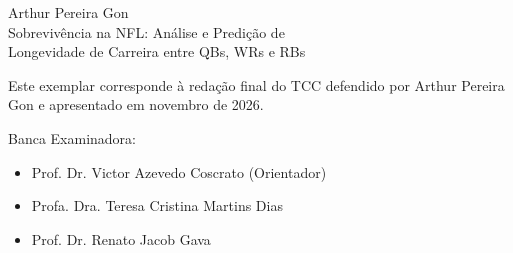 
\clearpage{\thispagestyle{empty}\origcleardoublepage}
\thispagestyle{empty}

\begin{center}
{\Large Arthur Pereira Gon} \\
\vspace{4cm}
{\Large Sobrevivência na NFL: Análise e Predição de \\
Longevidade de Carreira entre QBs, WRs e RBs}
\end{center}
\vspace{4.5cm}

\begin{flushright}
\begin{minipage}{0.55\textwidth}
Este exemplar corresponde à redação final do TCC defendido por Arthur Pereira Gon e apresentado em novembro de 2026.
\end{minipage}
\end{flushright}
\vspace{4.5cm}

Banca Examinadora:
\begin{itemize}
	\item Prof. Dr. Victor Azevedo Coscrato (Orientador)
	\item Profa. Dra. Teresa Cristina Martins Dias
	\item Prof. Dr. Renato Jacob Gava
\end{itemize}